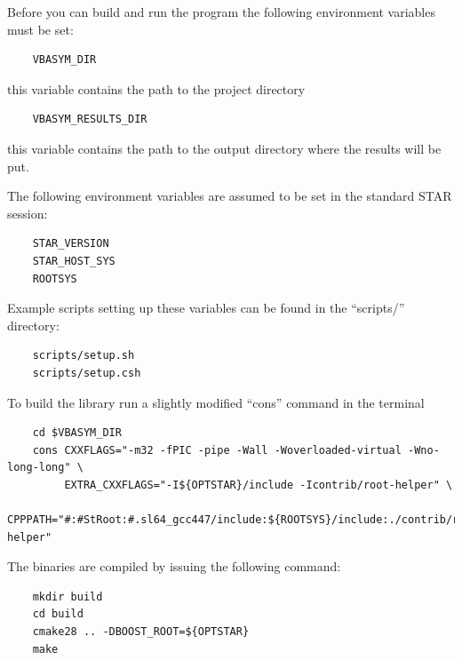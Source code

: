 \documentclass[12pt]{article}
\begin{document}


Before you can build and run the program the following environment variables must
be set:

\begin{lstlisting}
    VBASYM_DIR      
\end{lstlisting}  
this variable contains the path to the project directory 
\begin{lstlisting}  
    VBASYM_RESULTS_DIR
\end{lstlisting}
this variable contains the path to the output directory where the results will be put.

The following environment variables are assumed to be set in the standard STAR
session:

\begin{lstlisting}
    STAR_VERSION
    STAR_HOST_SYS
    ROOTSYS
\end{lstlisting}

Example scripts setting up these variables can be found in the ``scripts/''
directory:

\begin{lstlisting}
    scripts/setup.sh
    scripts/setup.csh
\end{lstlisting}

To build the library run a slightly modified ``cons'' command in the terminal

\begin{lstlisting}
    cd $VBASYM_DIR
    cons CXXFLAGS="-m32 -fPIC -pipe -Wall -Woverloaded-virtual -Wno-long-long" \
         EXTRA_CXXFLAGS="-I${OPTSTAR}/include -Icontrib/root-helper" \
         CPPPATH="#:#StRoot:#.sl64_gcc447/include:${ROOTSYS}/include:./contrib/root-helper"
\end{lstlisting}

The binaries are compiled by issuing the following command:

\begin{lstlisting}
    mkdir build
    cd build
    cmake28 .. -DBOOST_ROOT=${OPTSTAR}
    make
\end{lstlisting}
\end{document}
